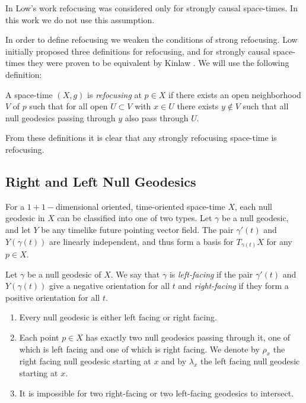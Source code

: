 \begin{rem}
In Low's work refocusing was considered only for strongly causal space-times.  In this work we do not use this assumption.
\end{rem}

In order to define refocusing we weaken the conditions of strong refocusing.  Low initially proposed three definitions for refocusing, and for strongly causal space-times they were proven to be equivalent by Kinlaw \cite{Kinlaw}.  We will use the following definition:
\begin{defin} \label{refoc}
A space-time $(X, g)$ is \emph{refocusing} at $p\in X$ if there exists an open neighborhood $V$ of $p$ such that for all open $U\subset V$ with $x\in U$ there exists $y\notin V$ such that all null geodesics passing through $y$ also pass through $U$.
\end{defin}

From these definitions it is clear that any strongly refocusing space-time is  refocusing.


\subsection{Right and Left Null Geodesics}
For a $1+1-$dimensional oriented, time-oriented space-time $X$, each null geodesic in $X$ can be classified into one of two types.  Let $\gamma$ be a null geodesic, and let $Y$ be any timelike future pointing vector field.  The pair $\gamma '(t)$ and $Y(\gamma(t))$ are linearly independent, and thus form a basis for $T_{\gamma(t)}X$ for any $p\in X$. 

\begin{defin}
Let $\gamma$ be a null geodesic of $X$.  We say that $\gamma$ is \emph{left-facing} if the pair $\gamma '(t)$ and $Y(\gamma(t))$ give a negative orientation for all $t$ and \emph{right-facing} if they form a positive orientation for all $t$. 
\end{defin}

\begin{rem}
\begin{enumerate}
\item Every null geodesic is either left facing or right facing.
\item Each point $p\in X$ has exactly two null geodesics passing through it, one of which is left facing and one of which is right facing.  We denote by $\rho_x$ the right facing null geodesic starting at $x$ and by $\lambda_x$ the left facing null geodesic starting at $x$.
\item It is impossible for two right-facing or two left-facing geodesics to intersect.
\end{enumerate}
\end{rem}



